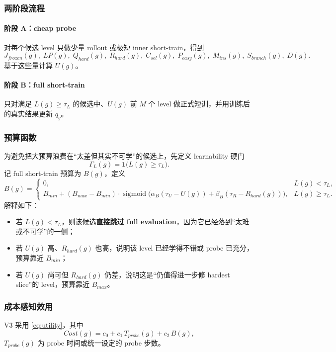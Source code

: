 \documentclass[11pt,a4paper]{ctexart}
\newcommand{\I}{\mathbf{1}}
\newcommand{\sigmoid}{\operatorname{sigmoid}}
\begin{document}
\subsubsection*{两阶段流程}
\paragraph{阶段 A：cheap probe}
对每个候选 level 只做少量 rollout 或极短 inner short-train，得到
\[
J_{frozen}(g),\; LP(g),\; Q_{hard}(g),\; R_{hard}(g),\; C_{sel}(g),\; P_{easy}(g),\; M_{ins}(g),\; S_{branch}(g),\; D(g).
\]
基于这些量计算 \(U(g)\)。

\paragraph{阶段 B：full short-train}
只对满足 \(L(g)\ge \tau_L\) 的候选中、\(U(g)\) 前 \(M\) 个 level 做正式短训，并用训练后的真实结果更新 \(q_g\)。

\subsubsection*{预算函数}
为避免把大预算浪费在“太差但其实不可学”的候选上，先定义 learnability 硬门
\begin{equation}
\Gamma_L(g)=\I\big(L(g)\ge \tau_L\big).
\label{eq:learnability_gate_budget}
\end{equation}
记 full short-train 预算为 \(B(g)\)，定义
\begin{equation}
B(g)=
\begin{cases}
0, & L(g)<\tau_L,\\
B_{min}+(B_{max}-B_{min})\cdot \sigmoid\Big(\alpha_B(\tau_U-U(g)) + \beta_B(\tau_R-R_{hard}(g))\Big), & L(g)\ge\tau_L.
\end{cases}
\label{eq:budget}
\end{equation}
解释如下：
\begin{itemize}[leftmargin=2.2em,itemsep=0.2em]
    \item 若 \(L(g)<\tau_L\)，则该候选\textbf{直接跳过 full evaluation}，因为它已经落到“太难或不可学”的一侧；
    \item 若 \(U(g)\) 高、\(R_{hard}(g)\) 也高，说明该 level 已经学得不错或 probe 已充分，预算靠近 \(B_{min}\)；
    \item 若 \(U(g)\) 尚可但 \(R_{hard}(g)\) 仍差，说明这是“仍值得进一步修 hardest slice”的 level，预算靠近 \(B_{max}\)。
\end{itemize}

\subsubsection*{成本感知效用}
V3 采用 \eqref{eq:utility}，其中
\begin{equation}
Cost(g)=c_0 + c_1\,T_{probe}(g)+c_2\,B(g),
\label{eq:cost}
\end{equation}
\(T_{probe}(g)\) 为 probe 时间或统一设定的 probe 步数。
\end{document}
